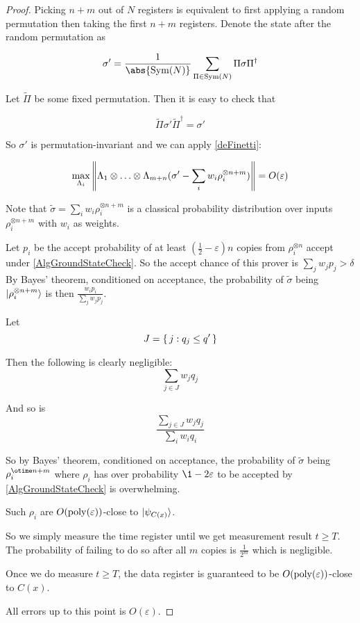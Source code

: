 \begin{proof}
	Picking $n+m$ out of $N$ registers is equivalent to first applying a random permutation then taking the first $n+m$ registers. Denote the state after the random permutation as

	$$\sigma'=\frac{1}{\abs{\Sym(N)}}\sum_{\Pi\in\Sym(N)}\Pi\sigma\Pi^\dagger$$

	Let $\tilde{\Pi}$ be some fixed permutation. Then it is easy to check that

	$$\tilde{\Pi}\sigma'\tilde{\Pi}^\dagger=\sigma'$$

	So $\sigma'$ is permutation-invariant and we can apply \autoref{deFinetti}:

	$$\max_{\Lambda_i}\left\lVert\Lambda_1\otimes\ldots\otimes\Lambda_{m+n}(\sigma'-\sum_i w_i\rho_i^{\otimes n+m})\right\rVert=O(\varepsilon)$$

	Note that $\tilde\sigma=\sum_i w_i\rho_i^{\otimes n+m}$ is a classical probability distribution over inputs $\rho_i^{\otimes n+m}$ with $w_i$ as weights.

	Let $p_i$ be the accept probability of at least $(\frac{1}{2}-\varepsilon)n$ copies from $\rho_i^{\otimes n}$ accept under \autoref{AlgGroundStateCheck}.
	So the accept chance of this prover is $\sum_j w_j p_j>\delta$
	By Bayes' theorem, conditioned on acceptance, the probability of $\tilde{\sigma}$ being $\ket{\rho_i^{\otimes n+m}}$ is then $\frac{w_i p_i}{\sum_j w_j p_j}$.

	Let
	$$J=\set{j:q_j\leq q'}$$

	Then the following is clearly negligible:
	$$\sum_{j\in J} w_j q_j$$

	And so is
	$$\frac{\sum_{j\in J} w_j q_j}{\sum_i w_i q_i}$$

	So by Bayes' theorem, conditioned on acceptance, the probability of $\tilde{\sigma}$ being $\rho_i^{\otime n+m}$ where $\rho_i$ has over probability $\1-2\varepsilon$ to be accepted by \autoref{AlgGroundStateCheck} is overwhelming.

	Such $\rho_i$ are $O(\operatorname*{\operatorname{poly}}(\varepsilon))$-close to $\ket{\psi_{C(x)}}$.

	So we simply measure the time register until we get measurement result $t\geq T$. The probability of failing to do so after all $m$ copies is $\frac{1}{2^m}$ which is negligible.
	
	Once we do measure $t\geq T$, the data register is guaranteed to be $O(\operatorname*{\operatorname{poly}}(\varepsilon))$-close to $C(x)$.

	All errors up to this point is $O(\varepsilon)$.

\end{proof}
